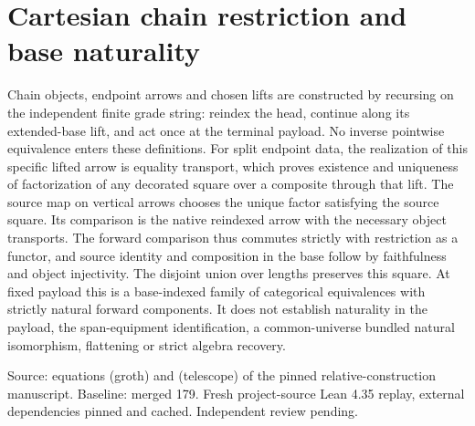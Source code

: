 \documentclass{article}
\begin{document}
\section*{Cartesian chain restriction and base naturality}
Chain objects, endpoint arrows and chosen lifts are constructed by recursing on the independent finite grade string: reindex the head, continue along its extended-base lift, and act once at the terminal payload. No inverse pointwise equivalence enters these definitions. For split endpoint data, the realization of this specific lifted arrow is equality transport, which proves existence and uniqueness of factorization of any decorated square over a composite through that lift. The source map on vertical arrows chooses the unique factor satisfying the source square. Its comparison is the native reindexed arrow with the necessary object transports. The forward comparison thus commutes strictly with restriction as a functor, and source identity and composition in the base follow by faithfulness and object injectivity. The disjoint union over lengths preserves this square. At fixed payload this is a base-indexed family of categorical equivalences with strictly natural forward components. It does not establish naturality in the payload, the span-equipment identification, a common-universe bundled natural isomorphism, flattening or strict algebra recovery.
\par Source: equations (groth) and (telescope) of the pinned relative-construction manuscript. Baseline: merged 179. Fresh project-source Lean 4.35 replay, external dependencies pinned and cached. Independent review pending.
\end{document}

